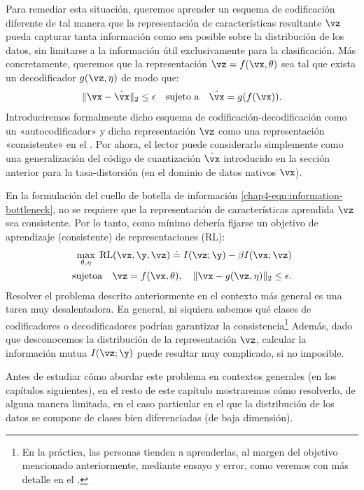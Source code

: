 \documentclass[../../book-main.tex]{subfiles}
\begin{document}
Para remediar esta situación, queremos aprender un esquema de codificación diferente
de tal manera que la representación de características resultante $\vz$ pueda
capturar tanta información como sea posible sobre la distribución de los datos,
sin limitarse a la información útil exclusivamente para la clasificación. Más concretamente,
queremos que la representación $\vz = f(\vx, \theta)$ sea tal que
exista un decodificador $g(\vz,\eta)$ de modo que:
\begin{equation}
    \|\vx - \hat \vx\|_2 \le \epsilon \quad \text{sujeto a} \quad \hat{\vx}
    = g(f(\vx)).
\end{equation}
Introduciremos formalmente dicho esquema de codificación-decodificación como un
«autocodificador» y dicha representación $\vz$ como una representación «consistente»
en el . Por ahora, el lector
puede considerarlo simplemente como una generalización del código de cuantización
$\hat \vx$ introducido en la sección anterior para la tasa-distorsión
(en el dominio de datos nativos $\vx$).

En la formulación del cuello de botella de información
\eqref{chap4-eqn:information-bottleneck}, no se requiere que la
representación de características aprendida $\vz$ sea consistente. Por lo tanto, como mínimo
debería fijarse un objetivo de aprendizaje (consistente) de representaciones (RL):
\begin{eqnarray}
    \max_{\theta,\eta}\; \mbox{RL}(\vx, \y, \vz) \doteq I(\vz; \y) - \beta
    I(\vx; \vz) \nonumber \\ \mathrm{sujeto a}\quad  \vz = f(\vx,\theta),\quad
    \|\vx - g(\vz, \eta) \|_2 \le \epsilon.
    \label{chap4-eqn:representation-learning}
\end{eqnarray}
Resolver el problema descrito anteriormente en el contexto más general es una tarea muy
desalentadora. En general, ni siquiera sabemos qué clases de
codificadores o decodificadores podrían garantizar la consistencia\footnote{En
    la práctica, las personas tienden a aprenderlas, al margen del objetivo
    mencionado anteriormente, mediante ensayo y error, como veremos con más detalle en el
.} Además, dado que desconocemos la
distribución de la representación $\vz$, calcular la información mutua
$I(\vz;\y)$ puede resultar muy complicado, si no imposible.

Antes de estudiar cómo abordar este problema en contextos generales (en
los capítulos siguientes), en el resto de este capítulo mostraremos
cómo resolverlo, de alguna manera limitada, en el caso particular en el que
la distribución de los datos se compone de clases bien diferenciadas (de baja dimensión).
\end{document}
